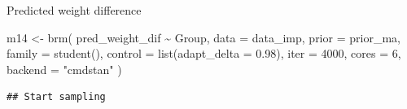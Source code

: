 \documentclass[
]{article}
\newenvironment{Shaded}{\begin{snugshade}}{\end{snugshade}}
\newcommand{\AttributeTok}[1]{\textcolor[rgb]{0.77,0.63,0.00}{#1}}
\newcommand{\CommentTok}[1]{\textcolor[rgb]{0.56,0.35,0.01}{\textit{#1}}}
\newcommand{\DecValTok}[1]{\textcolor[rgb]{0.00,0.00,0.81}{#1}}
\newcommand{\FloatTok}[1]{\textcolor[rgb]{0.00,0.00,0.81}{#1}}
\newcommand{\FunctionTok}[1]{\textcolor[rgb]{0.00,0.00,0.00}{#1}}
\newcommand{\NormalTok}[1]{#1}
\newcommand{\OtherTok}[1]{\textcolor[rgb]{0.56,0.35,0.01}{#1}}
\newcommand{\SpecialCharTok}[1]{\textcolor[rgb]{0.00,0.00,0.00}{#1}}
\newcommand{\StringTok}[1]{\textcolor[rgb]{0.31,0.60,0.02}{#1}}
\begin{document}
\begin{Shaded}
\end{Shaded}

Predicted weight difference

\begin{Shaded}
\begin{Highlighting}[]
\NormalTok{m14 }\OtherTok{\textless{}{-}} \FunctionTok{brm}\NormalTok{(}
\NormalTok{  pred\_weight\_dif }\SpecialCharTok{\textasciitilde{}}\NormalTok{ Group,}
  \AttributeTok{data =}\NormalTok{ data\_imp, }
  \AttributeTok{prior =}\NormalTok{ prior\_ma,}
  \AttributeTok{family =} \FunctionTok{student}\NormalTok{(),}
  \AttributeTok{control =} \FunctionTok{list}\NormalTok{(}\AttributeTok{adapt\_delta =} \FloatTok{0.98}\NormalTok{),}
  \AttributeTok{iter =} \DecValTok{4000}\NormalTok{,}
  \AttributeTok{cores =} \DecValTok{6}\NormalTok{,}
  \AttributeTok{backend =} \StringTok{"cmdstan"}
\NormalTok{)}
\end{Highlighting}
\end{Shaded}

\begin{verbatim}
## Start sampling
\end{verbatim}
\end{document}
